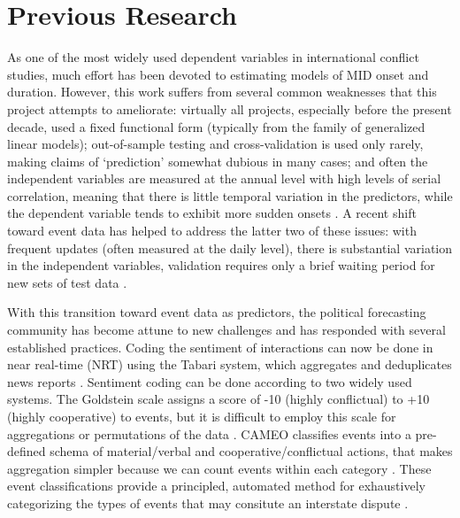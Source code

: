 \documentclass[12pt,letterpaper]{article}
\begin{document}

\section{Previous Research} %
\label{lit}


As one of the most widely used dependent variables in international conflict studies, much effort has been devoted to estimating models of MID onset and duration. However, this work suffers from several common weaknesses that this project attempts to ameliorate: virtually all projects, especially before the present decade, used a fixed functional form (typically from the family of generalized linear models); out-of-sample testing and cross-validation is used only rarely, making claims of `prediction' somewhat dubious in many cases; and often the independent variables are measured at the annual level with high levels of serial correlation, meaning that there is little temporal variation in the predictors, while the dependent variable tends to exhibit more sudden onsets \citep{ward2010perils}. A recent shift toward event data has helped to address the latter two of these issues: with frequent updates (often measured at the daily level), there is substantial variation in the independent variables, validation requires only a brief waiting period for new sets of test data \citep{gerner1994,gerner:etal:2002,king2003automated,ruggeri2011events,schrodt2013gdelt}. 

With this transition toward event data as predictors, the political forecasting community has become attune to new challenges and has responded with several established practices. Coding the sentiment of interactions can now be done in near real-time (NRT) using the Tabari system, which aggregates and deduplicates news reports \citep{o2010crisis,schrodt2009tabari}. Sentiment coding can be done according to two widely used systems. The Goldstein scale assigns a score of -10 (highly conflictual) to +10 (highly cooperative) to events, but it is difficult to employ this scale for aggregations or permutations of the data \citep{goldstein1992conflict}. CAMEO classifies events into a pre-defined schema of material/verbal and cooperative/conflictual actions, that makes aggregation simpler because we can count events within each category \citep{gerner:etal:2002}. These event classifications provide a principled, automated method for exhaustively categorizing  the types of events that may consitute an interstate dispute \citep{ghosn2004mid3}.
\end{document}
